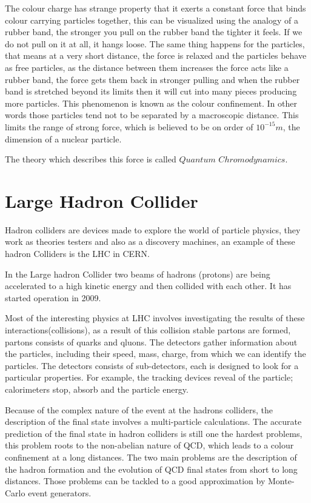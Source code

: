 The colour charge has strange property that it exerts a constant force that binds colour carrying particles together, this can be visualized using the analogy of a rubber band, the stronger you pull on the rubber band the tighter it feels.
If we do not pull on it at all, it hangs loose. The same thing happens for the particles,  that means at a very short distance, the force is relaxed and the particles behave as free particles, as the distance between them increases the force acts like a rubber band, the force gets them back in stronger pulling and when the rubber band is stretched beyond its limits then it will cut into many pieces producing more particles. This phenomenon is known as the colour confinement. In other words those particles tend not to be separated by a macroscopic distance.
This limits the range of strong force, which is believed to be on order of $10^{-15}\si{m}$,
the dimension of a nuclear particle.

The theory which describes this force is called $Quantum$ $Chromodynamics$.

\section{Large Hadron Collider}

Hadron colliders are devices made to explore the world of particle physics, they work as theories testers and also as a discovery machines, an example of these hadron Colliders is the LHC in CERN.

In the Large hadron Collider two beams of hadrons  (protons) are being accelerated to a high kinetic energy and then collided with each other. It has started operation in 2009.
 
Most of the interesting physics at LHC involves investigating the results of these interactions(collisions), as a result of this collision stable partons are formed, partons consists of quarks and qluons. The detectors gather information about the particles, including their speed, mass, charge, from which we can identify the particles. The detectors consists of sub-detectors, each is designed to look for a particular properties. For example, the tracking devices reveal of the particle; calorimeters stop, absorb and the particle energy.   

Because of the complex nature of the event at the hadrons colliders, the description of the final state involves a multi-particle calculations. The accurate prediction of the final state in hadron colliders is still one the hardest problems, this problem roots to the non-abelian nature of QCD, which leads to a colour confinement at a long distances. The two main problems are the description of the hadron formation and the evolution of QCD final states from short to long distances. Those problems can be tackled to a good approximation by Monte-Carlo event generators.


